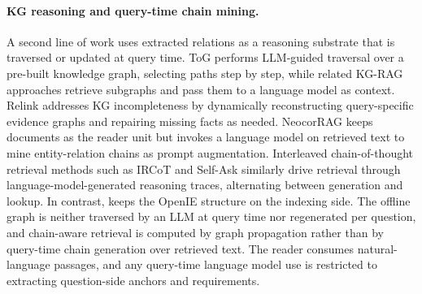 \paragraph{KG reasoning and query-time chain mining.}
A second line of work uses extracted relations as a reasoning substrate
that is traversed or updated at query time. ToG \citep{sun2024tog}
performs LLM-guided traversal over a pre-built knowledge graph,
selecting paths step by step, while related KG-RAG approaches
\citep{baek2023kaping} retrieve subgraphs and pass them to a language
model as context. Relink \citep{huang2026relink} addresses KG
incompleteness by dynamically reconstructing query-specific evidence
graphs and repairing missing facts as needed. NeocorRAG
\citep{peng2026neocorrag} keeps documents as the reader unit but
invokes a language model on retrieved text to mine entity-relation
chains as prompt augmentation. Interleaved chain-of-thought retrieval
methods such as IRCoT \citep{trivedi2023ircot} and Self-Ask
\citep{press2023selfask} similarly drive retrieval through
language-model-generated reasoning traces, alternating between
generation and lookup. In contrast, \methodname{} keeps the OpenIE
structure on the indexing side. The offline graph is neither traversed
by an LLM at query time nor regenerated per question, and chain-aware
retrieval is computed by graph propagation rather than by query-time
chain generation over retrieved text. The reader consumes
natural-language passages, and any query-time language model use is
restricted to extracting question-side anchors and requirements.

